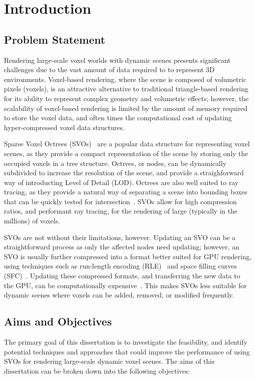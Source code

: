 \chapter{Introduction}

\section{Problem Statement}
Rendering large-scale voxel worlds with dynamic scenes presents significant challenges due to the vast amount of data
required to to represent 3D environments. Voxel-based rendering, where the scene is composed of volumetric pixels (voxels),
is an attractive alternative to traditional triangle-based rendering for its ability to represent complex geometry and
volumetric effects; however, the scalability of voxel-based rendering is limited by the amount of memory required to store
the voxel data, and often times the computational cost of updating hyper-compressed voxel data structures.

Sparse Voxel Octrees (SVOs)~\cite{Laine_Karras_2010} are a popular data structure for representing voxel scenes, as they
provide a compact representation of the scene by storing only the occupied voxels in a tree structure. Octrees, or nodes,
can be dynamically subdivided to increase the resolution of the scene, and provide a straighforward way of introducting
Level of Detail (LOD). Octrees are also well suited to ray tracing, as they provide a natural way of separating a scene
into bounding boxes that can be quickly tested for intersection~\cite{Ize_2009}. SVOs allow for high compression ratios,
and performant ray tracing, for the rendering of large (typically in the millions) of voxels.

SVOs are not without their limitations, however. Updating an SVO can be a straightforward process as only the affected
nodes need updating; however, an SVO is usually further compressed into a format better suited for GPU rendering, using
techniques such as run-length encoding (RLE)~\cite{Eisenwave_RLE} and space filling curves (SFC)~\cite{Eisenwave_SFC}.
Updating these compressed formats, and transferring the new data to the GPU, can be computationally expensive~\cite{Crassin_2012}.
This makes SVOs less suitable for dynamic scenes where voxels can be added, removed, or modified frequently.

\section{Aims and Objectives}
The primary goal of this dissertation is to investigate the feasibility, and identify potential techniques and approaches
that could improve the performance of using SVOs for rendering large-scale dynamic voxel scenes. The aims of this
dissertation can be broken down into the following objectives:


